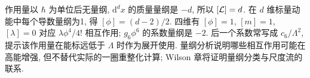 作用量以 $\hbar$ 为单位后无量纲, $\mathrm d^dx$ 的质量量纲是 $-d$, 所以 $[\mathcal L]=d$. 在 $d$ 维标量动能中每个导数量纲为1, 得 $[\phi]=(d-2)/2$. 四维有 $[\phi]=1$, $[m]=1$, $[\lambda]=0$ 对应 $\lambda\phi^4/4!$ 相互作用; $g_6\phi^6$ 的系数量纲是 $-2$. 后一个系数常写成 $c_6/\Lambda^2$, 提示该作用量在能标远低于 $\Lambda$ 时作为展开使用. 量纲分析说明哪些相互作用可能在高能增强, 但不替代实际的一圈重整化计算; Wilson 章将证明量纲分类与尺度流的联系.
